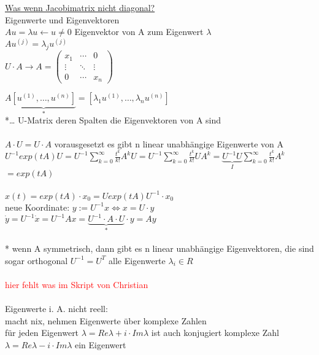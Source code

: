\underline{Was wenn Jacobimatrix nicht diagonal?}\\
Eigenwerte und Eigenvektoren\\
$Au=\lambda u \leftarrow u\neq 0$ Eigenvektor von A zum Eigenwert $\lambda$\\
$Au^{(j)}=\lambda_j u^{(j)}$\\
$U \cdot A \rightarrow A=
\begin{pmatrix}
 x_1 & \cdots & 0 \\
 \vdots  & \ddots & \vdots  \\
 0 & \cdots & x_n
\end{pmatrix}
$

$A \underbrace{[u^{(1)}, … , u^{(n)}]}_{*} = [\lambda_1 u^{(1)}, … , \lambda_n u^{(n)}]$\\
*… U-Matrix deren Spalten die Eigenvektoren von A sind\\\\

$A \cdot U = U \cdot A$ vorausgesetzt es gibt n linear unabhängige Eigenwerte von A\\
$U^{-1} exp(tA) U = U^{-1} \sum_{k=0}^{\infty} \frac{t^k}{k!} A^k U = U^{-1} \sum_{k=0}^{\infty} \frac{t^k}{k!} U A^k = \underbrace{U^{-1} U}_{I} \sum_{k=0}^{\infty} \frac{t^k}{k!} A^k$\\
$= exp(tA)$
\\\\

$x(t)=exp(tA) \cdot x_0 = U exp(tA) U^{-1} \cdot x_0$\\
neue Koordinate: $y:=U^{-1}x \Leftrightarrow x=U \cdot y$\\
$\dot{y}=U^{-1} \dot{x} = U^{-1} Ax = \underbrace{U^{-1} \cdot A \cdot U}_{*} \cdot y = Ay$\\\\
* wenn A symmetrisch, dann gibt es n linear unabhängige Eigenvektoren, die sind sogar orthogonal $U^{-1}=U^T$ alle Eigenwerte $\lambda_i \in R$\\\\

\textcolor{red}{hier fehlt was im Skript von Christian}\\\\

Eigenwerte i. A. nicht reell:\\
macht nix, nehmen Eigenwerte über komplexe Zahlen\\
für jeden Eigenwert $\lambda=Re \lambda + i \cdot Im \lambda$ ist auch konjugiert komplexe Zahl $\lambda=Re \lambda - i \cdot Im \lambda$ ein Eigenwert\\\\

